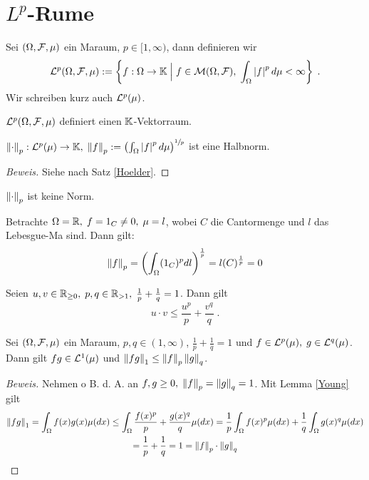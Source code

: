\section{$L^p$-R\as ume}

\begin{definition}
	Sei \((\Omega, \mathcal{F}, \mu)\) ein Ma\s raum, \(p\in [1,\infty)\), dann definieren wir
	\[\mathcal{L}^p(\Omega, \mathcal{F}, \mu) := \left\{f:\Omega \to \mathbb{K} \;\Big\vert\; f\in \mathcal{M}(\Omega, \mathcal{F}), \; \int_\Omega \left\lvert f \right\rvert^p d\mu < \infty\right\}\;.\]
	Wir schreiben kurz auch \(\mathcal{L}^p(\mu)\).
\end{definition}
\begin{rem}
	\(\mathcal{L}^p(\Omega, \mathcal{F}, \mu)\) definiert einen $\mathbb{K}$-Vektorraum.
\end{rem}

\begin{theorem}
	\(\left\lVert\cdot\right\rVert_{p}: \mathcal{L}^p(\mu) \to \mathbb{K}, \; \left\lVert f\right\rVert_{p} := \left(\int_\Omega \left\lvert f \right\rvert^p d \mu\right)^{\sfrac{1}{p}}\) ist eine Halbnorm. \label{p_halbnorm}
\end{theorem}
\begin{proof}[Beweis]
	Siehe nach Satz \ref{Hoelder}.
\end{proof}
\begin{rem}
	\(\left\lVert\cdot\right\rVert_{p}\) ist keine Norm.
\end{rem}
\begin{ex}
	Betrachte \(\Omega = \mathbb{R},\; f = 1_C \neq 0 ,\; \mu = l\), wobei $C$ die Cantormenge und $l$ das Lebesgue-Ma\s{} sind. Dann gilt:
	\[\left\lVert f\right\rVert_{p} = \left(\int_\Omega (1_C)^p dl\right)^\frac 1p = l(C)^{\frac 1p} = 0\]
	
\end{ex}
\begin{lemma}
	Seien \(u,v \in \mathbb{R}_{\geq 0}, \; p, q \in \mathbb{R}_{>1}, \; \frac{1}{p} + \frac{1}{q} = 1\). Dann gilt
	\[u\cdot v \leq \frac{u^p}{p} + \frac{v^q}{q}\;.\]\label{Young}
\end{lemma}

\begin{theorem}
	Sei \((\Omega, \mathcal{F}, \mu)\) ein Ma\s raum, \(p, q \in (1,\infty)\), \(\frac{1}{p} + \frac{1}{q} = 1\) und \(f\in \mathcal{L}^p(\mu), \;g\in \mathcal{L}^q(\mu)\). Dann gilt \(fg \in \mathcal{L}^1(\mu)\) und \(\left\lVert fg\right\rVert_{1} \leq \left\lVert f\right\rVert_{p} \left\lVert g\right\rVert_{q}\).
	\label{Hoelder}
\end{theorem}
\begin{proof}[Beweis]
	Nehmen o B. d. A. an \(f,g \geq 0, \; \left\lVert f\right\rVert_{p} = \left\lVert g\right\rVert_{q} = 1\). Mit Lemma \ref{Young} gilt
	\begin{multline*}\left\lVert fg\right\rVert_{1} = \int_\Omega f(x) g(x) \mu(dx) \leq \int_\Omega \frac{f(x)^p}{p} + \frac{g(x)^q}{q}\mu(dx) = \frac{1}{p} \int_\Omega f(x)^p \mu(dx) + \frac{1}{q} \int_\Omega g(x)^q \mu(dx) \\= \frac{1}{p} + \frac{1}{q} = 1 = \left\lVert f\right\rVert_{p} \cdot \left\lVert g\right\rVert_{q}
	\end{multline*}
\end{proof}

